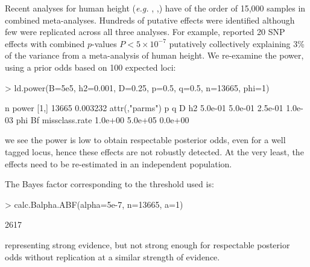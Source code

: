 \documentclass[a4paper,10pt]{amsart}
\def\eg{\textit{e.g.}}
\begin{document}
Recent analyses for human height (\eg{} \citet{Gudbjartssonetal2008},
\citet{LangoAllen2010},\citet{Weedonetal2008}) have of the order of
15,000 samples in combined meta-analyses. Hundreds of putative effects
were identified although few were replicated across all three analyses.
For example, \cite[Table 1, p577]{Weedonetal2008} reported 20 SNP
effects with combined $p$-values $P < 5\times 10^{-7}$ putatively
collectively explaining 3\% of the variance from a meta-analysis of
human height. We re-examine the power, using a prior odds based on 100 expected loci:

\begin{Schunk}
\begin{Sinput}
> ld.power(B=5e5, h2=0.001, D=0.25, p=0.5, q=0.5, n=13665, phi=1) 
\end{Sinput}
\begin{Soutput}
         n    power
[1,] 13665 0.003232
attr(,"parms")
             p              q              D             h2 
       5.0e-01        5.0e-01        2.5e-01        1.0e-03 
           phi             Bf missclass.rate 
       1.0e+00        5.0e+05        0.0e+00 
\end{Soutput}
\end{Schunk}
we see the power is low to obtain respectable posterior odds, even for
a well tagged locus, hence these effects are not robustly detected. 
At the very least, the effects need to be re-estimated in an independent population.

The  Bayes factor corresponding to the threshold used is:
\begin{Schunk}
\begin{Sinput}
> calc.Balpha.ABF(alpha=5e-7, n=13665, a=1)
\end{Sinput}
\begin{Soutput}
[1] 2617
\end{Soutput}
\end{Schunk}
representing strong evidence, but not strong enough for respectable
posterior odds without replication at a similar strength of evidence.
\end{document}

